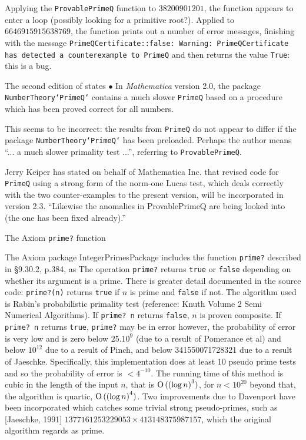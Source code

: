 Applying the {\tt ProvablePrimeQ} function to $38200901201$, the function appears
to enter a loop (possibly looking for a primitive root?).
Applied to $6646915915638769$,
the function prints out a number of error messages, finishing with the message
{\tt PrimeQCertificate::false: Warning: PrimeQCertificate has detected a
counterexample to PrimeQ} and then returns the value {\tt True}: this is a bug.

The second edition of \cite{45} states
\block
$\bullet$  In {\it Mathematica} version 2.0, the package {\tt NumberTheory`PrimeQ`}
contains a much slower {\tt PrimeQ} based on a procedure which has been proved
correct for all numbers.
\endblock

This seems to be incorrect: the results from {\tt PrimeQ} do not appear to
differ if the package {\tt NumberTheory`PrimeQ`} has been preloaded.  Perhaps
the author means ``... a much slower primality test ...'', referring to
{\tt ProvablePrimeQ}.

\medskip

Jerry Keiper has stated on behalf of Mathematica Inc.{} that revised code for
{\tt PrimeQ} using a strong form of the norm-one Lucas test, 
which deals correctly with the two counter-examples to the
present version, will be incorporated in version 2.3.
``Likewise the anomalies in ProvablePrimeQ are being looked into 
(the one has been fixed already).''



\subhead The Axiom {\tt prime?} function \endsubhead

The Axiom package IntegerPrimesPackage includes the function {\tt prime?}
described in \cite{24} \S9.30.2, p.384, as
\block
The operation {\tt prime?} returns {\tt true} or {\tt false} depending on whether
its argument is a prime.
\endblock
There is greater detail documented in the source code:
\block
\def\spad#1{{\tt #1}}%
\spad{prime?(n)} returns {\tt true} if $n$ is prime and {\tt false} if not.
The algorithm used is Rabin's probabilistic primality test
(reference: Knuth Volume 2 Semi Numerical Algorithms).
If \spad{prime? n} returns {\tt false}, $n$ is proven composite.
If \spad{prime? n} returns {\tt true}, {\tt prime?} may be in error
however, the probability of error is very low
and is zero below $25.10^9$ (due to a result of Pomerance et al)
and below $10^{12}$ due to a result of Pinch,
and below 341550071728321 due to a result of Jaeschke.
Specifically, this implementation does at least 10 pseudo prime
tests and so the probability of error is $< 4^{-10}$.
The running time of this method is cubic in the length
of the input $n$, that is $\O((\log n)^3)$, for $n < 10^{20}$
beyond that, the algorithm is quartic, $\O((\log n)^4)$.
Two improvements due to Davenport have been incorporated
which catches some trivial strong pseudo-primes, such as
[Jaeschke, 1991] $1377161253229053 \times 413148375987157$, which
the original algorithm regards as prime.
\endblock

